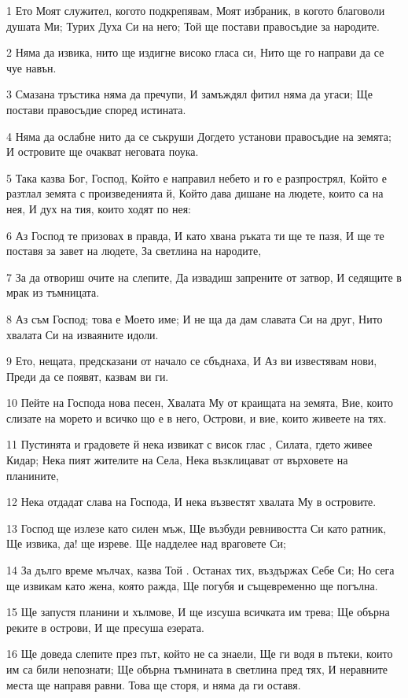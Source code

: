 \par 1 Ето Моят служител, когото подкрепявам, Моят избраник, в когото благоволи душата Ми; Турих Духа Си на него; Той ще постави правосъдие за народите.
\par 2 Няма да извика, нито ще издигне високо гласа си, Нито ще го направи да се чуе навън.
\par 3 Смазана тръстика няма да пречупи, И замъждял фитил няма да угаси; Ще постави правосъдие според истината.
\par 4 Няма да ослабне нито да се съкруши Догдето установи правосъдие на земята; И островите ще очакват неговата поука.
\par 5 Така казва Бог, Господ, Който е направил небето и го е разпрострял, Който е разтлал земята с произведенията й, Който дава дишане на людете, които са на нея, И дух на тия, които ходят по нея:
\par 6 Аз Господ те призовах в правда, И като хвана ръката ти ще те пазя, И ще те поставя за завет на людете, За светлина на народите,
\par 7 За да отвориш очите на слепите, Да извадиш запрените от затвор, И седящите в мрак из тъмницата.
\par 8 Аз съм Господ; това е Моето име; И не ща да дам славата Си на друг, Нито хвалата Си на изваяните идоли.
\par 9 Ето, нещата, предсказани от начало се сбъднаха, И Аз ви известявам нови, Преди да се появят, казвам ви ги.
\par 10 Пейте на Господа нова песен, Хвалата Му от краищата на земята, Вие, които слизате на морето и всичко що е в него, Острови, и вие, които живеете на тях.
\par 11 Пустинята и градовете й нека извикат с висок глас , Силата, гдето живее Кидар; Нека пият жителите на Села, Нека възклицават от върховете на планините,
\par 12 Нека отдадат слава на Господа, И нека възвестят хвалата Му в островите.
\par 13 Господ ще излезе като силен мъж, Ще възбуди ревнивостта Си като ратник, Ще извика, да! ще изреве. Ще надделее над враговете Си;
\par 14 За дълго време мълчах, казва Той . Останах тих, въздържах Себе Си; Но сега ще извикам като жена, която ражда, Ще погубя и същевременно ще погълна.
\par 15 Ще запустя планини и хълмове, И ще изсуша всичката им трева; Ще обърна реките в острови, И ще пресуша езерата.
\par 16 Ще доведа слепите през път, който не са знаели, Ще ги водя в пътеки, които им са били непознати; Ще обърна тъмнината в светлина пред тях, И неравните места ще направя равни. Това ще сторя, и няма да ги оставя.
